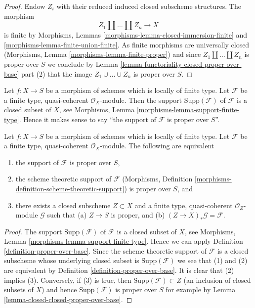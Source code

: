 \begin{proof}
Endow $Z_i$ with their reduced induced closed subscheme structures.
The morphism
$$
Z_1 \amalg \ldots \amalg Z_n \longrightarrow X
$$
is finite by Morphisms, Lemmas
\ref{morphisms-lemma-closed-immersion-finite} and
\ref{morphisms-lemma-finite-union-finite}.
As finite morphisms are universally closed
(Morphisms, Lemma \ref{morphisms-lemma-finite-proper})
and since $Z_1 \amalg \ldots \amalg Z_n$ is proper over $S$
we conclude by
Lemma \ref{lemma-functoriality-closed-proper-over-base} part (2)
that the image $Z_1 \cup \ldots \cup Z_n$ is proper over $S$.
\end{proof}

\noindent
Let $f : X \to S$ be a morphism of schemes which is locally
of finite type. Let $\mathcal{F}$ be a finite type, quasi-coherent
$\mathcal{O}_X$-module. Then the support $\text{Supp}(\mathcal{F})$
of $\mathcal{F}$ is a closed subset of $X$, see
Morphisms, Lemma \ref{morphisms-lemma-support-finite-type}.
Hence it makes sense to say
``the support of $\mathcal{F}$ is proper over $S$''.

\begin{lemma}
\label{lemma-module-support-proper-over-base}
Let $f : X \to S$ be a morphism of schemes which is locally
of finite type. Let $\mathcal{F}$ be a finite type, quasi-coherent
$\mathcal{O}_X$-module. The following are equivalent
\begin{enumerate}
\item the support of $\mathcal{F}$ is proper over $S$,
\item the scheme theoretic support of $\mathcal{F}$
(Morphisms, Definition \ref{morphisms-definition-scheme-theoretic-support})
is proper over $S$, and
\item there exists a closed subscheme $Z \subset X$ and
a finite type, quasi-coherent $\mathcal{O}_Z$-module
$\mathcal{G}$ such that (a) $Z \to S$ is proper, and (b)
$(Z \to X)_*\mathcal{G} = \mathcal{F}$.
\end{enumerate}
\end{lemma}

\begin{proof}
The support $\text{Supp}(\mathcal{F})$ of $\mathcal{F}$ is a closed subset
of $X$, see Morphisms, Lemma \ref{morphisms-lemma-support-finite-type}.
Hence we can apply Definition \ref{definition-proper-over-base}.
Since the scheme theoretic support of $\mathcal{F}$ is a closed
subscheme whose underlying closed subset is $\text{Supp}(\mathcal{F})$
we see that (1) and (2) are equivalent by
Definition \ref{definition-proper-over-base}.
It is clear that (2) implies (3).
Conversely, if (3) is true, then
$\text{Supp}(\mathcal{F}) \subset Z$
(an inclusion of closed subsets of $X$)
and hence $\text{Supp}(\mathcal{F})$
is proper over $S$ for example by
Lemma \ref{lemma-closed-closed-proper-over-base}.
\end{proof}

